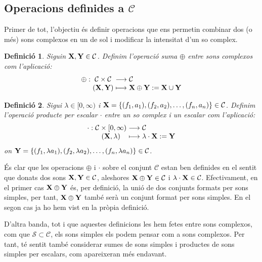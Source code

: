 \documentclass{article}
\theoremstyle{math}
\newtheorem{definition}{Definició}[section]
\theoremstyle{TheoremNum}
\newcommand{\0}{\ensuremath{\vb{0}}}
\newcommand{\X}{\ensuremath{\vb{X}}}
\newcommand{\Y}{\ensuremath{\vb{Y}}}
\begin{document}
\subsection{Operacions definides a \texorpdfstring{$\mathcal{C}$}{C}}
Primer de tot, l'objectiu és definir operacions que ens permetin combinar dos (o més) sons complexos en un de sol i modificar la intensitat d'un so complex.
\begin{definition}
    Siguin $\X,\Y\in\mathcal{C}$. Definim l'operació \textit{suma $\oplus$} entre sons complexos com l'aplicació:
    \begin{equation*}
        \begin{array}{r@{\hspace{0.5\tabcolsep}}c@{\hspace{0.5\tabcolsep}}c@{\hspace{0.5\tabcolsep}}l}
            \oplus:&\mathcal{C}\times\mathcal{C}&\longrightarrow&\mathcal{C}\\
            &(\X,\Y)&\longmapsto&\X\oplus \Y:=\X\cup\Y
        \end{array}
    \end{equation*}
\end{definition}
\begin{definition}\label{prod_per_escalar}
    Sigui $\lambda\in[0,\infty)$ i $\X=\{(f_1,a_1),(f_2,a_2),\ldots,(f_n,a_n)\}\in\mathcal{C}$. Definim l'operació \textit{producte per escalar $\cdot$} entre un so complex i un escalar com l'aplicació:
    \begin{equation*}
        \begin{array}{r@{\hspace{0.5\tabcolsep}}c@{\hspace{0.5\tabcolsep}}c@{\hspace{0.5\tabcolsep}}l}
            \cdot:&\mathcal{C}\times[0,\infty)&\longrightarrow&\mathcal{C}\\
            &(\X,\lambda)&\longmapsto&\lambda\cdot \X:=\Y
        \end{array}
    \end{equation*}
    on $\Y=\{(f_1,\lambda a_1),(f_2,\lambda a_2),\ldots,(f_n,\lambda a_n)\}\in\mathcal{C}$.
\end{definition}
És clar que les operacions $\oplus$ i $\cdot$ sobre el conjunt $\mathcal{C}$ estan ben definides en el sentit que donats dos sons $\X,\Y\in\mathcal{C}$, aleshores $\X\oplus\Y\in\mathcal{C}$ i $\lambda\cdot\X\in\mathcal{C}$. Efectivament, en el primer cas $\X\oplus\Y$ és, per definició, la unió de dos conjunts formats per sons simples, per tant, $\X\oplus\Y$ també serà un conjunt format per sons simples. En el segon cas ja ho hem vist en la pròpia definició.\par
D'altra banda, tot i que aquestes definicions les hem fetes entre sons complexos, com que $\mathcal{S}\subset\mathcal{C}$, els sons simples els podem pensar com a sons complexos. Per tant, té sentit també considerar sumes de sons simples i productes de sons simples per escalars, com apareixeran més endavant.
\end{document}
